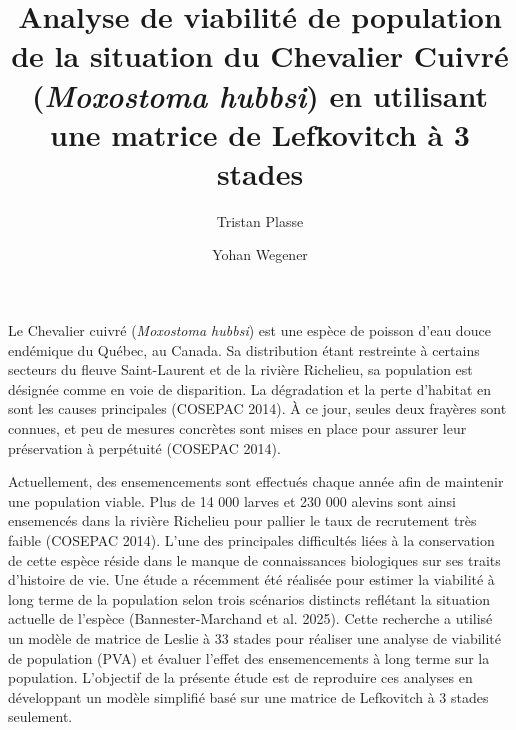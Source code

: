 \documentclass[9pt,twocolumn,twoside,]{pnas-new}
\date{}
\title{Analyse de viabilité de population de la situation du Chevalier
Cuivré (\emph{Moxostoma hubbsi}) en utilisant une matrice de Lefkovitch
à 3 stades}
\author[a]{Tristan Plasse}
\author[a]{Yohan Wegener}
\affil[a]{Université de Sherbrooke, Département de Biologie,
Sherbrooke, Québec, J1K 2R1}
\begin{document}
\verticaladjustment{-2pt}



\maketitle
\thispagestyle{firststyle}


\acknow{}

Le Chevalier cuivré (\emph{Moxostoma hubbsi}) est une espèce de poisson
d'eau douce endémique du Québec, au Canada. Sa distribution étant
restreinte à certains secteurs du fleuve Saint-Laurent et de la rivière
Richelieu, sa population est désignée comme en voie de disparition. La
dégradation et la perte d'habitat en sont les causes principales
(COSEPAC 2014). À ce jour, seules deux frayères sont connues, et peu de
mesures concrètes sont mises en place pour assurer leur préservation à
perpétuité (COSEPAC 2014).

Actuellement, des ensemencements sont effectués chaque année afin de
maintenir une population viable. Plus de 14 000 larves et 230 000
alevins sont ainsi ensemencés dans la rivière Richelieu pour pallier le
taux de recrutement très faible (COSEPAC 2014). L'une des principales
difficultés liées à la conservation de cette espèce réside dans le
manque de connaissances biologiques sur ses traits d'histoire de vie.
Une étude a récemment été réalisée pour estimer la viabilité à long
terme de la population selon trois scénarios distincts reflétant la
situation actuelle de l'espèce (Bannester-Marchand et al. 2025). Cette
recherche a utilisé un modèle de matrice de Leslie à 33 stades pour
réaliser une analyse de viabilité de population (PVA) et évaluer l'effet
des ensemencements à long terme sur la population. L'objectif de la
présente étude est de reproduire ces analyses en développant un modèle
simplifié basé sur une matrice de Lefkovitch à 3 stades seulement.
\end{document}
